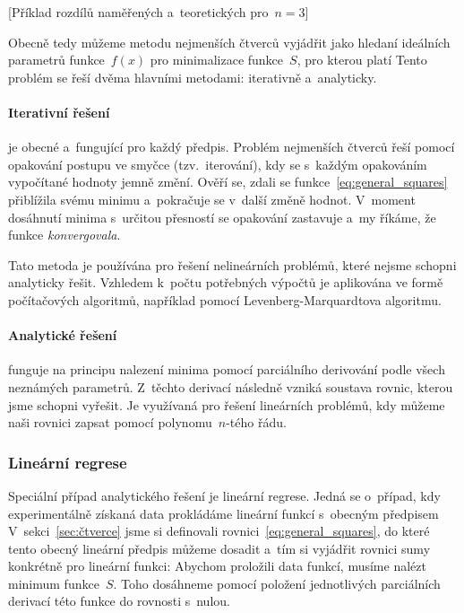 [Příklad rozdílů naměřených a~teoretických pro~$n=3$]

Obecně tedy můžeme metodu nejmenších čtverců vyjádřit jako hledaní ideálních 
parametrů funkce~$f(x)$ pro minimalizace funkce~$S$, pro kterou platí
Tento problém se řeší dvěma hlavními metodami: iterativně a~analyticky.

\paragraph{Iterativní řešení} je obecné a~fungující pro každý předpis. Problém
nejmenších čtverců řeší pomocí opakování postupu ve smyčce (tzv.~iterování),
kdy se s~každým opakováním vypočítané hodnoty jemně změní. Ověří se, zdali se
funkce~\eqref{eq:general_squares} přiblížila svému minimu a~pokračuje se
v~další změně hodnot. V~moment dosáhnutí minima s~určitou přesností se
opakování zastavuje a~my říkáme, že funkce \emph{konvergovala}.

Tato metoda je používána pro řešení nelineárních problémů, které nejsme schopni
analyticky řešit. Vzhledem k~počtu potřebných výpočtů je aplikována ve formě
počítačových algoritmů, například pomocí Levenberg-Marquardtova algoritmu.

\paragraph{Analytické řešení} funguje na principu nalezení minima pomocí
parciálního derivování podle všech neznámých parametrů. Z~těchto derivací
následně vzniká soustava rovnic, kterou jsme schopni vyřešit. Je využívaná pro
řešení lineárních problémů, kdy můžeme naši rovnici zapsat pomocí
polynomu~$n$-tého řádu.

\subsubsection{Lineární regrese}
\label{sec:lin-regrese}
Speciální případ analytického řešení je lineární regrese. Jedná se o~případ,
kdy experimentálně získaná data prokládáme lineární funkcí s~obecným předpisem
V~sekci~\ref{sec:čtverce} jsme si definovali rovnici~\eqref{eq:general_squares},
do které tento obecný lineární předpis můžeme dosadit a~tím si vyjádřit rovnici
sumy konkrétně pro lineární funkci:
Abychom proložili data funkcí, musíme nalézt minimum funkce~$S$. Toho dosáhneme
pomocí položení jednotlivých parciálních derivací této funkce do rovnosti
s~nulou.~\cite{wolfram} 

